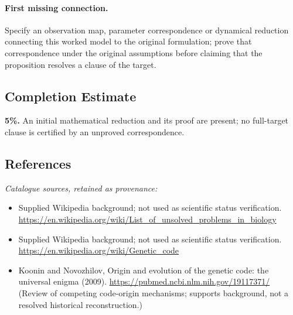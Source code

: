 \documentclass[11pt]{article}
\begin{document}
\paragraph{First missing connection.} Specify an observation map, parameter correspondence or dynamical reduction connecting this worked model to the original formulation; prove that correspondence under the original assumptions before claiming that the proposition resolves a clause of the target.
\subsection{Completion Estimate}
\textbf{5\%.} An initial mathematical reduction and its proof are present; no full-target clause is certified by an unproved correspondence.
\subsection{References}
\noindent\emph{Catalogue sources, retained as provenance:}
\begin{itemize}
\item Supplied Wikipedia background; not used as scientific status verification. \url{https://en.wikipedia.org/wiki/List_of_unsolved_problems_in_biology}
\item Supplied Wikipedia background; not used as scientific status verification. \url{https://en.wikipedia.org/wiki/Genetic_code}
\item Koonin and Novozhilov, Origin and evolution of the genetic code: the universal enigma (2009). \url{https://pubmed.ncbi.nlm.nih.gov/19117371/} (Review of competing code-origin mechanisms; supports background, not a resolved historical reconstruction.)
\end{itemize}
\end{document}
